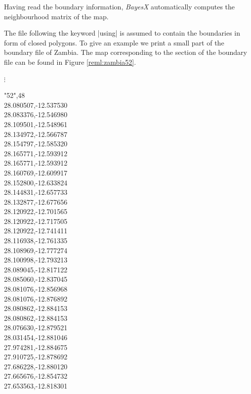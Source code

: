Having read the boundary information, {\it BayesX} automatically computes the neighbourhood matrix of the map.

The file following the keyword |using| is assumed to contain the boundaries in form of closed polygons. To give an example we
print a small part of the boundary file of Zambia. The map corresponding to the section of the boundary file can be found in
Figure \ref{reml:zambia52}.

\footnotesize

\hspace{1cm}  $\vdots$

 "52",48\\
 28.080507,-12.537530\\
 28.083376,-12.546980\\
 28.109501,-12.548961\\
 28.134972,-12.566787\\
 28.154797,-12.585320\\
 28.165771,-12.593912\\
 28.165771,-12.593912\\
 28.160769,-12.609917\\
 28.152800,-12.633824\\
 28.144831,-12.657733\\
 28.132877,-12.677656\\
 28.120922,-12.701565\\
 28.120922,-12.717505\\
 28.120922,-12.741411\\
 28.116938,-12.761335\\
 28.108969,-12.777274\\
 28.100998,-12.793213\\
 28.089045,-12.817122\\
 28.085060,-12.837045\\
 28.081076,-12.856968\\
 28.081076,-12.876892\\
 28.080862,-12.884153\\
 28.080862,-12.884153\\
 28.076630,-12.879521\\
 28.031454,-12.881046\\
 27.974281,-12.884675\\
 27.910725,-12.878692\\
 27.686228,-12.880120\\
 27.665676,-12.854732\\
 27.653563,-12.818301\\
